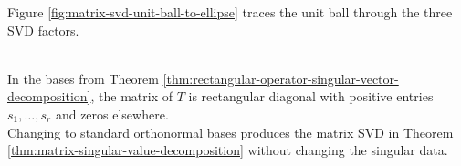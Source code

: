 Figure \ref{fig:matrix-svd-unit-ball-to-ellipse} traces the unit ball through the three SVD factors.

\begin{illustrationfigure}[H]
  \centering
  
  \caption{The factors $W^*$, $\Sigma$, and $V$ rotate, stretch, and reorient the unit ball.}
  \label{fig:matrix-svd-unit-ball-to-ellipse}
\end{illustrationfigure}

\begin{perspective} \label{per:operator-to-matrix-svd-bridge} \\
In the bases from Theorem \ref{thm:rectangular-operator-singular-vector-decomposition}, the matrix of $T$ is rectangular diagonal with positive entries $s_1,\ldots,s_r$ and zeros elsewhere.\\
Changing to standard orthonormal bases produces the matrix SVD in Theorem \ref{thm:matrix-singular-value-decomposition} without changing the singular data.
\end{perspective}

